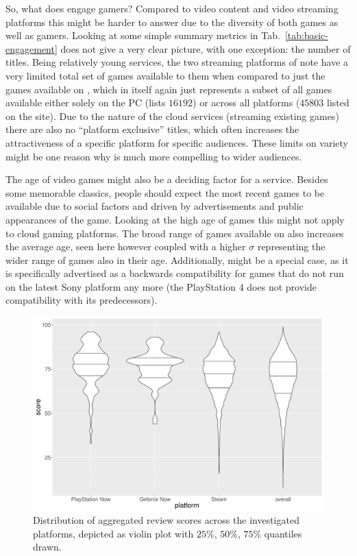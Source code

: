 So, what does engage gamers? Compared to video content and video streaming platforms this might be harder to answer due to the diversity of both games as well as gamers. Looking at some simple summary metrics in Tab.~\ref{tab:basic-engagement} does not give a very clear picture, with one exception: the number of titles. Being relatively young services, the two streaming platforms of note have a very limited total set of games available to them when compared to just the games available on \steam, which in itself again just represents a subset of all games available either solely on the PC (\metacritic lists $16192$) or across all platforms ($45803$ listed on the site). Due to the nature of the cloud services (streaming existing games) there are also no ``platform exclusive'' titles, which often increases the attractiveness of a specific platform for specific audiences. These limits on variety might be one reason why \steam is much more compelling to wider audiences.

The age of video games might also be a deciding factor for a service. Besides some memorable classics, people should expect the most recent games to be available due to social factors and driven by advertisements and public appearances of the game. Looking at the high age of games this might not apply to cloud gaming platforms. The broad range of games available on \steam also increases the average age, seen here however coupled with a higher $\sigma$ representing the wider range of games also in their age. Additionally, \psnow might be a special case, as it is specifically advertised as a backwards compatibility for games that do not run on the latest Sony platform any more (the PlayStation 4 does not provide compatibility with its predecessors).

\begin{figure}[!t]
	\centering
	\includegraphics[width=1.0\columnwidth]{images/scores-by-platform-violin.pdf}
	\caption{Distribution of aggregated review scores across the investigated platforms, depicted as violin plot with $25\%$, $50\%$, $75\%$ quantiles drawn.}
\label{fig:scores-by-platform}
\end{figure}


